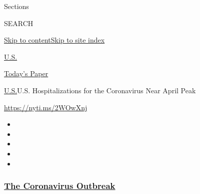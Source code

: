 Sections

SEARCH

\protect\hyperlink{site-content}{Skip to
content}\protect\hyperlink{site-index}{Skip to site index}

\href{https://www.nytimes3xbfgragh.onion/section/us}{U.S.}

\href{https://myaccount.nytimes3xbfgragh.onion/auth/login?response_type=cookie\&client_id=vi}{}

\href{https://www.nytimes3xbfgragh.onion/section/todayspaper}{Today's
Paper}

\href{/section/us}{U.S.}\textbar{}U.S. Hospitalizations for the
Coronavirus Near April Peak

\url{https://nyti.ms/2WOwXnj}

\begin{itemize}
\item
\item
\item
\item
\item
\end{itemize}

\hypertarget{the-coronavirus-outbreak}{%
\subsubsection{\texorpdfstring{\href{https://www.nytimes3xbfgragh.onion/news-event/coronavirus?name=styln-coronavirus-national\&region=TOP_BANNER\&variant=undefined\&block=storyline_menu_recirc\&action=click\&pgtype=Article\&impression_id=01f15490-e385-11ea-9d1b-a1f39ff1b44f}{The
Coronavirus
Outbreak}}{The Coronavirus Outbreak}}\label{the-coronavirus-outbreak}}

